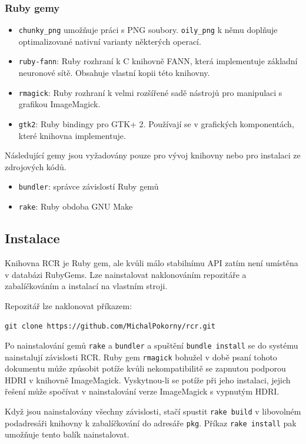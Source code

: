 \documentclass[a4paper]{article}
\def\githuburl{https://github.com/MichalPokorny/rcr.git}
\begin{document}
\subsubsection{Ruby gemy}
\begin{itemize}
\item \texttt{chunky\_png} umožňuje práci s PNG soubory.
	\texttt{oily\_png} k němu doplňuje optimalizované nativní varianty
	některých operací.
\item \texttt{ruby-fann}: Ruby rozhraní k C knihovně FANN, která implementuje
	základní neuronové sítě. Obsahuje vlastní kopii této knihovny.
\item \texttt{rmagick}: Ruby rozhraní k velmi rozšířené sadě nástrojů pro
	manipulaci s grafikou ImageMagick.
\item \texttt{gtk2}: Ruby bindingy pro GTK+ 2. Používají se v grafických
	komponentách, které knihovna implementuje.
\end{itemize}

Následující gemy jsou vyžadovány pouze pro vývoj knihovny nebo pro instalaci
ze zdrojových kódů.
\begin{itemize}
\item \texttt{bundler}: správce závislostí Ruby gemů
\item \texttt{rake}: Ruby obdoba GNU Make
\end{itemize}

\subsection{Instalace}
Knihovna RCR je Ruby gem, ale kvůli málo stabilnímu API zatím není umístěna
v databázi RubyGems. Lze nainstalovat naklonováním repozitáře a zabalíčkováním
a instalací na vlastním stroji.

Repozitář lze naklonovat příkazem:
\begin{center}
	\texttt{git clone \githuburl}
\end{center}

Po nainstalování gemů \texttt{rake} a \texttt{bundler} a spuštění
\texttt{bundle install} se do systému nainstalují závislosti RCR.
Ruby gem \texttt{rmagick} bohužel v době psaní tohoto dokumentu
může způsobit potíže kvůli nekompatibilitě se zapnutou podporou HDRI
v knihovně ImageMagick. Vyskytnou-li se potíže při jeho instalaci,
jejich řešení může spočívat v nainstalování verze ImageMagick s vypnutým
HDRI.

Když jsou nainstalovány všechny závislosti,
stačí spustit \texttt{rake build} v libovolném podadresáři knihovny
k zabalíčkování do adresáře \texttt{pkg}. Příkaz \texttt{rake install} pak
umožňuje tento balík nainstalovat.
\end{document}
